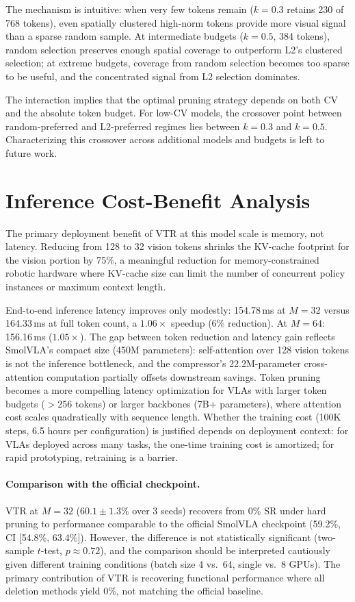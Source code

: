 The mechanism is intuitive: when very few tokens remain ($k{=}0.3$ retains 230 of 768 tokens), even spatially clustered high-norm tokens provide more visual signal than a sparse random sample. At intermediate budgets ($k{=}0.5$, 384 tokens), random selection preserves enough spatial coverage to outperform L2's clustered selection; at extreme budgets, coverage from random selection becomes too sparse to be useful, and the concentrated signal from L2 selection dominates.

The interaction implies that the optimal pruning strategy depends on both CV and the absolute token budget. For low-CV models, the crossover point between random-preferred and L2-preferred regimes lies between $k{=}0.3$ and $k{=}0.5$. Characterizing this crossover across additional models and budgets is left to future work.


\section{Inference Cost-Benefit Analysis}
\label{app:cost_benefit}

The primary deployment benefit of VTR at this model scale is memory, not latency. Reducing from 128 to 32 vision tokens shrinks the KV-cache footprint for the vision portion by 75\%, a meaningful reduction for memory-constrained robotic hardware where KV-cache size can limit the number of concurrent policy instances or maximum context length.

End-to-end inference latency improves only modestly: 154.78\,ms at $M{=}32$ versus 164.33\,ms at full token count, a $1.06\times$ speedup (6\% reduction). At $M{=}64$: 156.16\,ms ($1.05\times$). The gap between token reduction and latency gain reflects SmolVLA's compact size (450M parameters): self-attention over 128 vision tokens is not the inference bottleneck, and the compressor's 22.2M-parameter cross-attention computation partially offsets downstream savings. Token pruning becomes a more compelling latency optimization for VLAs with larger token budgets ($>$256 tokens) or larger backbones (7B+ parameters), where attention cost scales quadratically with sequence length. Whether the training cost (100K steps, 6.5 hours per configuration) is justified depends on deployment context: for VLAs deployed across many tasks, the one-time training cost is amortized; for rapid prototyping, retraining is a barrier.

\paragraph{Comparison with the official checkpoint.}
VTR at $M = 32$ ($60.1 \pm 1.3$\% over 3 seeds) recovers from 0\% SR under hard pruning to performance comparable to the official SmolVLA checkpoint (59.2\%, CI [54.8\%, 63.4\%]). However, the difference is not statistically significant (two-sample $t$-test, $p \approx 0.72$), and the comparison should be interpreted cautiously given different training conditions (batch size 4 vs.\ 64, single vs.\ 8 GPUs). The primary contribution of VTR is recovering functional performance where all deletion methods yield 0\%, not matching the official baseline.

